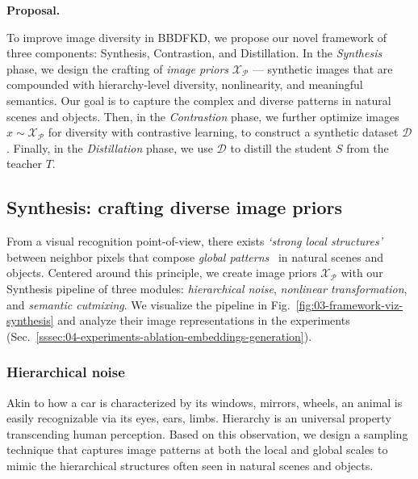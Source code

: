 \textbf{Proposal.}
\begin{foldable} %
    To improve image diversity in BBDFKD, we propose our novel framework \textbf{\methodname} of three components: Synthesis, Contrastion, and Distillation.
    In the \textit{Synthesis} phase, we design the crafting of \textit{image priors} $\mathcal{X}_\mathcal{P}$ --- synthetic images that are compounded with hierarchy-level diversity, nonlinearity, and meaningful semantics.
    Our goal is to capture the complex and diverse patterns in natural scenes and objects.
    Then, in the \textit{Contrastion} phase, we further optimize images $\hat{x}\sim\mathcal{X}_\mathcal{P}$ for diversity with contrastive learning, to construct a synthetic dataset $\mathcal{D}$.
    Finally, in the \textit{Distillation} phase, we use $\mathcal{D}$ to distill the student $S$ from the teacher $T$.
\end{foldable}


\subsection{Synthesis: crafting diverse image priors} \label{ssec:03-framework-synthesis}
\begin{foldable} %
    From a visual recognition point-of-view, there exists \textit{`strong local structures'} between neighbor pixels that compose \textit{global patterns}~\cite{lecun2002gradient} in natural scenes and objects.
    Centered around this principle, we create image priors $\mathcal{X}_\mathcal{P}$ with our Synthesis pipeline of three modules: \textit{hierarchical noise}, \textit{nonlinear transformation}, and \textit{semantic cutmixing}.
    We visualize the pipeline in Fig.~\ref{fig:03-framework-viz-synthesis} and analyze their image representations in the experiments (Sec.~\ref{sssec:04-experiments-ablation-embeddings-generation}).
\end{foldable}

\subsubsection{Hierarchical noise} \label{sssec:03-framework-synthesis-hiernoise}
\begin{foldable} %
    Akin to how a car is characterized by its windows, mirrors, wheels, an animal is easily recognizable via its eyes, ears, limbs.
    Hierarchy is an universal property transcending human perception.
    Based on this observation, we design a sampling technique that captures image patterns at both the local and global scales to mimic the hierarchical structures often seen in natural scenes and objects.
\end{foldable}

